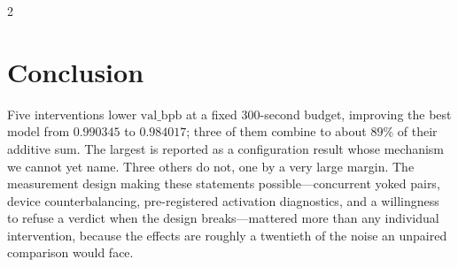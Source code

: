 \documentclass[10pt]{article}
\begin{document}
\begin{multicols}{2}
\section{Conclusion}

Five interventions lower $\mathrm{val\_bpb}$ at a fixed 300-second budget, improving the
best model from $0.990345$ to $0.984017$; three of them combine to about $89\%$ of their
additive sum. The largest is reported as a configuration result whose mechanism we cannot
yet name. Three others do not, one by a very large margin. The measurement design making
these statements possible---concurrent yoked pairs, device counterbalancing,
pre-registered activation diagnostics, and a willingness to refuse a verdict when the
design breaks---mattered more than any individual intervention, because the effects are
roughly a twentieth of the noise an unpaired comparison would face.

\end{multicols}
\end{document}

